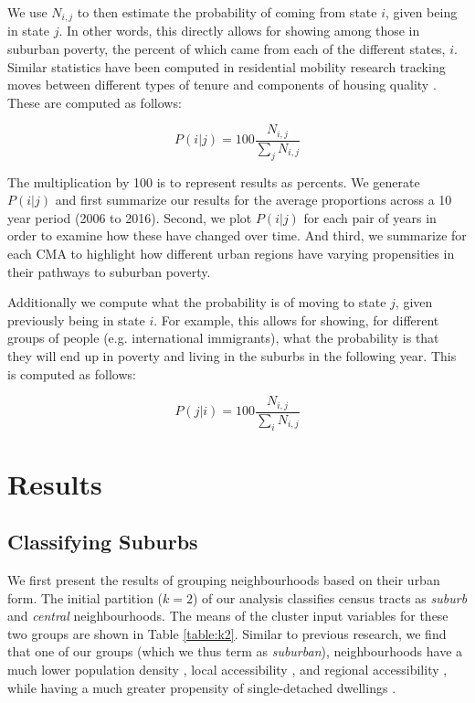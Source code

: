 We use $N_{i,j}$ to then estimate the probability of coming from state $i$, given being in state $j$. In other words, this directly allows for showing among those in suburban poverty, the percent of which came from each of the different states, $i$. Similar statistics have been computed in residential mobility research tracking moves between different types of tenure \cite{withers_methodological_1997} and components of housing quality \cite{patel_effects_2020}. These are computed as follows:



\begin{equation}
P(i|j) = 100 \frac{N_{i,j}}{\sum_j N_{i,j}}
\end{equation}


The multiplication by 100 is to represent results as percents. We generate $P(i|j)$ and first summarize our results for the average proportions across a 10 year period (2006 to 2016). Second, we plot $P(i|j)$ for each pair of years in order to examine how these have changed over time. And third, we summarize for each CMA to highlight how different urban regions have varying propensities in their pathways to suburban poverty. 

Additionally we compute what the probability is of moving to state $j$, given previously being in state $i$. For example, this allows for showing, for different groups of people (e.g. international immigrants), what the probability is that they will end up in poverty and living in the suburbs in the following year. This is computed as follows:


\begin{equation}
P(j|i) = 100 \frac{N_{i,j}}{\sum_i N_{i,j}}
\end{equation}





\section{Results}

\subsection{Classifying Suburbs}

We first present the results of grouping neighbourhoods based on their urban form. The initial partition ($k = 2$) of our analysis classifies census tracts as \textit{suburb} and \textit{central} neighbourhoods. The means of the cluster input variables for these two groups are shown in Table \ref{table:k2}. Similar to previous research, we find that one of our groups (which we thus term as \textit{suburban}), neighbourhoods have a much lower population density \cite{hanibuchi_does_2012, massey_suburbanization_2018,airgood-obrycki_suburban_2019}, local accessibility \cite{ewing2014measuring}, and regional accessibility \cite{torrens2000measuring,zhang_dynamics_2020}, while having a much greater propensity of single-detached dwellings \cite{moos_suburban_2015, ades_is_2016}.


